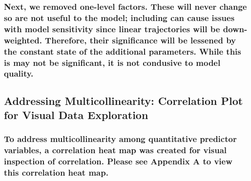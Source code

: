 \documentclass[american,]{article}
\begin{document}
\hypertarget{next-we-removed-one-level-factors.-these-will-never-change-so-are-not-useful-to-the-model-including-can-cause-issues-with-model-sensitivity-since-linear-trajectories-will-be-down-weighted.-therefore-their-significance-will-be-lessened-by-the-constant-state-of-the-additional-parameters.-while-this-is-may-not-be-significant-it-is-not-condusive-to-model-quality.}{%
\subsubsection{Next, we removed one-level factors. These will never change so are not useful to the model; including can cause issues with model sensitivity since linear trajectories will be down-weighted. Therefore, their significance will be lessened by the constant state of the additional parameters. While this is may not be significant, it is not condusive to model quality.}\label{next-we-removed-one-level-factors.-these-will-never-change-so-are-not-useful-to-the-model-including-can-cause-issues-with-model-sensitivity-since-linear-trajectories-will-be-down-weighted.-therefore-their-significance-will-be-lessened-by-the-constant-state-of-the-additional-parameters.-while-this-is-may-not-be-significant-it-is-not-condusive-to-model-quality.}}

\hypertarget{addressing-multicollinearity-correlation-plot-for-visual-data-exploration}{%
\subsection{\texorpdfstring{\textbf{Addressing Multicollinearity: Correlation Plot for Visual Data Exploration}}{Addressing Multicollinearity: Correlation Plot for Visual Data Exploration}}\label{addressing-multicollinearity-correlation-plot-for-visual-data-exploration}}

\hypertarget{to-address-multicollinearity-among-quantitative-predictor-variables-a-correlation-heat-map-was-created-for-visual-inspection-of-correlation.-please-see-appendix-a-to-view-this-correlation-heat-map.}{%
\subsubsection{To address multicollinearity among quantitative predictor variables, a correlation heat map was created for visual inspection of correlation. Please see Appendix A to view this correlation heat map.}\label{to-address-multicollinearity-among-quantitative-predictor-variables-a-correlation-heat-map-was-created-for-visual-inspection-of-correlation.-please-see-appendix-a-to-view-this-correlation-heat-map.}}
\end{document}
